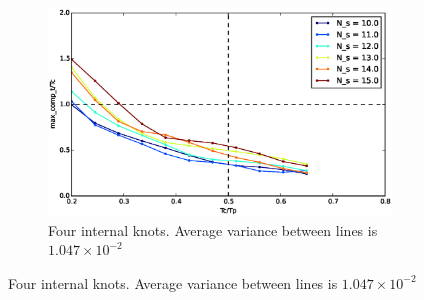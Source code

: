 
\begin{figure}[!h]
        \centering
        ~ %
        \begin{subfigure}[b]{0.48\textwidth}
                \includegraphics[width=\textwidth]{./images/realtime/Scenario_3__N_knots_4/mcttc-tctp.eps}
                \caption{Four internal knots. Average variance between lines is $1.047\times 10^{-2}$}\label{fig:uni34}
        \end{subfigure}
        

\end{figure}
